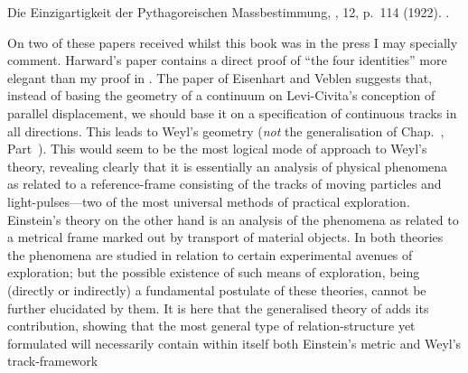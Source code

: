 \documentclass[12pt]{book}
\begin{document}
\Bibitem{\Same} Die Einzigartigkeit der Pythagoreischen Massbestimmung, , 12, p.~114
(1922). .
\medskip

On two of these papers received whilst this book was in the press I may specially
comment. Harward's paper contains a direct proof of ``the four identities'' more elegant
than my proof in . The paper of Eisenhart and Veblen suggests that, instead of basing
the geometry of a continuum on Levi-Civita's conception of parallel displacement, we should
base it on a specification of continuous tracks in all directions. This leads to Weyl's geometry
(\emph{not} the generalisation of Chap.~, Part~). This would seem to be the most logical mode
of approach to Weyl's theory, revealing clearly that it is essentially an analysis of physical
phenomena as related to a reference-frame consisting of the tracks of moving particles and
light-pulses---two of the most universal methods of practical exploration. Einstein's theory
on the other hand is an analysis of the phenomena as related to a metrical frame marked
out by transport of material objects. In both theories the phenomena are studied in relation
to certain experimental avenues of exploration; but the possible existence of such means
of exploration, being (directly or indirectly) a fundamental postulate of these theories,
cannot be further elucidated by them. It is here that the generalised theory of  adds
its contribution, showing that the most general type of relation-structure yet formulated
will necessarily contain within itself both Einstein's metric and Weyl's track-framework

\printindex
\end{document}
